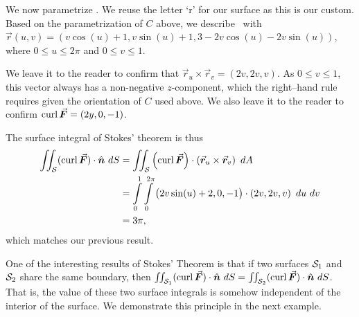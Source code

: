 \begin{example}
We now parametrize \surfaceS. We reuse the letter `r' for our surface as this is our custom. Based on the parametrization of $C$ above, we describe \surfaceS\ with \\ $\vec r(u,v) = \left( v\cos (u)+1, v\sin (u)+1, 3-2v\cos(u)-2v\sin (u)\right)$, where $0\leq u\leq 2\pi$ and $0\leq v\leq 1$. 

We leave it to the reader to confirm that $\vec r_u\times \vec r_v = \left( 2v,2v,v\right)$. As $0\leq v\leq 1$, this vector always has a non-negative $z$-component, which the right--hand rule requires given the orientation of $C$ used above. We also leave it to the reader to confirm $\curl\vec F = \left( 2y,0,-1\right)$.

The surface integral of Stokes' theorem is thus
\begin{align*}
\iint_\surfaceS (\curl\vec F)\cdot \hat n\ dS &= \iint_\surfaceS \left(\curl\vec F\right)\cdot \left(\vec r_u\times \vec r_v\right)\ dA \\
	&= \int\limits_0^1\int\limits_0^{2\pi} \left( 2v\sin (u)+2,0,-1\right)\cdot\left( 2v,2v,v\right)\ du\ dv\\
	&= 3\pi,
\end{align*}
which matches our previous result.
\end{example}

One of the interesting results of Stokes' Theorem is that if two surfaces $\mathcal{S}_1$ and $\mathcal{S}_2$ share the same boundary, then $\iint_{\surfaceS_1} (\curl \vec F)\cdot \hat n\ dS = \iint_{\surfaceS_2} (\curl \vec F)\cdot \hat n\ dS$. That is, the value of these two surface integrals is somehow independent of the interior of the surface. We demonstrate this principle in the next example.


